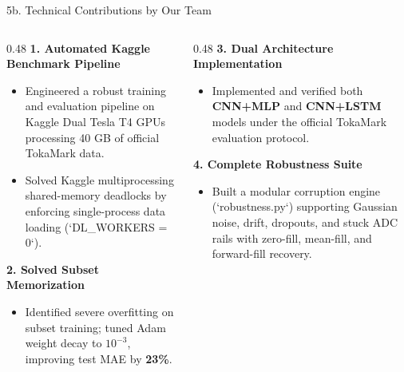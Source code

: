 \documentclass[aspectratio=169, 10pt]{beamer}
\begin{document}
\begin{frame}{5b. Technical Contributions by Our Team}
  \begin{columns}[T]
    \begin{column}{0.48\textwidth}
      \textbf{\color{NavyBlue} 1. Automated Kaggle Benchmark Pipeline}
      \begin{itemize}
        \item Engineered a robust training and evaluation pipeline on Kaggle Dual Tesla T4 GPUs processing 40 GB of official TokaMark data.
        \item Solved Kaggle multiprocessing shared-memory deadlocks by enforcing single-process data loading (`DL_WORKERS = 0`).
      \end{itemize}
      \vspace{4pt}
      \textbf{\color{NavyBlue} 2. Solved Subset Memorization}
      \begin{itemize}
        \item Identified severe overfitting on subset training; tuned Adam weight decay to $10^{-3}$, improving test MAE by \textbf{23\%}.
      \end{itemize}
    \end{column}

    \begin{column}{0.48\textwidth}
      \textbf{\color{NavyBlue} 3. Dual Architecture Implementation}
      \begin{itemize}
        \item Implemented and verified both \textbf{CNN+MLP} and \textbf{CNN+LSTM} models under the official TokaMark evaluation protocol.
      \end{itemize}
      \vspace{4pt}
      \textbf{\color{NavyBlue} 4. Complete Robustness Suite}
      \begin{itemize}
        \item Built a modular corruption engine (`robustness.py`) supporting Gaussian noise, drift, dropouts, and stuck ADC rails with zero-fill, mean-fill, and forward-fill recovery.
      \end{itemize}
    \end{column}
  \end{columns}
\end{frame}
\end{document}
